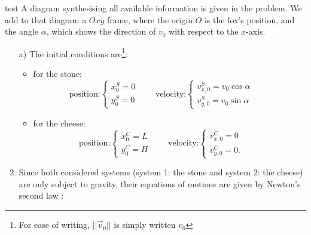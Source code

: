 %
%

\begin{center}
\vspace*{5mm}
\end{center}
test
A diagram synthesising all available information is given in the problem. We add to that diagram a $Oxy$ frame, where the origin $O$ is the fox's position, and the angle $\alpha$, which shows the direction of $v_0$ with respect to the $x$-axis.
\begin{center}

\end{center}
\begin{enumerate}
\item[a)] The initial conditions are\footnote{For ease of writing, $||\vec{v}_0||$ is simply written $v_0$}:\\
\begin{itemize}
\item for the stone: \\
\begin{displaymath}
\textrm{position:}
\left\{ \begin{array}{l}
x_0^S = 0 \\
y_0^S = 0
\end{array}\right.\qquad
\textrm{velocity:}
\left\{ \begin{array}{l}
v_{x,0}^S = v_0\cos\alpha\\
v_{y,0}^S = v_0\sin\alpha
\end{array}\right.\qquad
\end{displaymath}
\item for the cheese: \\
\begin{displaymath}
\textrm{position:}
\left\{ \begin{array}{l}
x_0^C = L \\
y_0^C = H
\end{array}\right.\qquad
\textrm{velocity:}
\left\{ \begin{array}{l}
v_{x,0}^C = 0\\
v_{y,0}^C = 0.
\end{array}\right.\qquad
\end{displaymath}
\end{itemize}
\item Since both considered systems (system 1: the stone and system 2: the cheese) are only subject to gravity, their equations of motions are given by Newton's second law : 

\end{enumerate}
